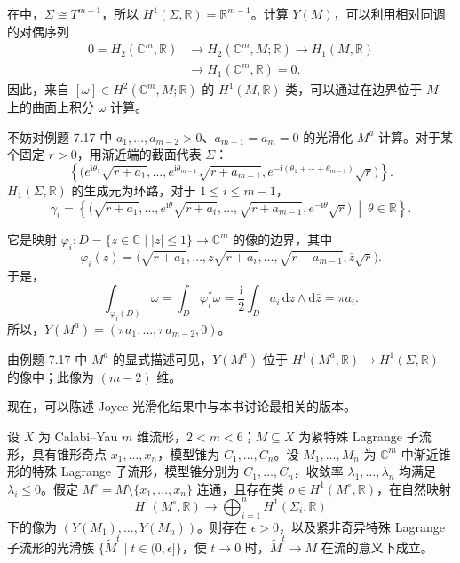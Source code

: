 \begin{example}\label{ex:7.20}
在中，$\Sigma\cong T^{m-1}$，所以 $H^1(\Sigma,\mathbb R)=\mathbb R^{m-1}$。计算 $Y(M)$，可以利用相对同调的对偶序列
\[
\begin{split}
0=H_2(\mathbb C^m,\mathbb R)&\longrightarrow H_2(\mathbb C^m,M;\mathbb R)
\longrightarrow H_1(M,\mathbb R)\\
&\longrightarrow H_1(\mathbb C^m,\mathbb R)=0.
\end{split}
\]
因此，来自 $[\omega]\in H^2(\mathbb C^m,M;\mathbb R)$ 的 $H^1(M,\mathbb R)$ 类，可以通过在边界位于 $M$ 上的曲面上积分 $\omega$ 计算。

不妨对例题 7.17 中 $a_1,\ldots,a_{m-2}>0$、$a_{m-1}=a_m=0$ 的光滑化 $M^a$ 计算。对于某个固定 $r>0$，用渐近端的截面代表 $\Sigma$：
\[
\left\{\bigl(e^{\mathrm i\theta_1}\sqrt{r+a_1},\ldots,
e^{\mathrm i\theta_{m-1}}\sqrt{r+a_{m-1}},
e^{-\mathrm i(\theta_1+\cdots+\theta_{m-1})}\sqrt r\bigr)\right\}.
\]
$H_1(\Sigma,\mathbb R)$ 的生成元为环路，对于 $1\leq i\leq m-1$，
\[
\gamma_i=\left\{\bigl(\sqrt{r+a_1},\ldots,
e^{\mathrm i\theta}\sqrt{r+a_i},\ldots,
\sqrt{r+a_{m-1}},e^{-\mathrm i\theta}\sqrt r\bigr)
\ \middle|\ \theta\in\mathbb R\right\}.
\]

它是映射 $\varphi_i\colon D=\{z\in\mathbb C\mid|z|\leq1\}\to\mathbb C^m$ 的像的边界，其中
\[
\varphi_i(z)=\bigl(\sqrt{r+a_1},\ldots,
z\sqrt{r+a_i},\ldots,\sqrt{r+a_{m-1}},\bar z\sqrt r\bigr).
\]
于是，
\[
\int_{\varphi_i(D)}\omega
=\int_D\varphi_i^*\omega
=\frac{\mathrm i}2\int_Da_i\,\mathrm dz\wedge\mathrm d\bar z
=\pi a_i.
\]
所以，$Y(M^a)=(\pi a_1,\ldots,\pi a_{m-2},0)$。

由例题 7.17 中 $M^a$ 的显式描述可见，$Y(M^a)$ 位于 $H^1(M^a,\mathbb R)\to H^1(\Sigma,\mathbb R)$ 的像中；此像为 $(m-2)$ 维。
\end{example}

现在，可以陈述 Joyce 光滑化结果中与本书讨论最相关的版本。
\begin{theorem}\label{thm:7.21}
设 $X$ 为 Calabi--Yau $m$ 维流形，$2<m<6$；$M\subseteq X$ 为紧特殊 Lagrange 子流形，具有锥形奇点 $x_1,\ldots,x_n$，模型锥为 $C_1,\ldots,C_n$。设 $M_1,\ldots,M_n$ 为 $\mathbb C^m$ 中渐近锥形的特殊 Lagrange 子流形，模型锥分别为 $C_1,\ldots,C_n$，收敛率 $\lambda_1,\ldots,\lambda_n$ 均满足 $\lambda_i\leq0$。假定 $M^\circ=M\setminus\{x_1,\ldots,x_n\}$ 连通，且存在类 $\rho\in H^1(M^\circ,\mathbb R)$，在自然映射
\[
H^1(M^\circ,\mathbb R)\longrightarrow
\bigoplus_{i=1}^nH^1(\Sigma_i,\mathbb R)
\]
下的像为 $(Y(M_1),\ldots,Y(M_n))$。则存在 $\epsilon>0$，以及紧非奇异特殊 Lagrange 子流形的光滑族 $\{\widetilde M^t\mid t\in(0,\epsilon]\}$，使 $t\to0$ 时，$\widetilde M^t\to M$ 在流的意义下成立。
\end{theorem}

